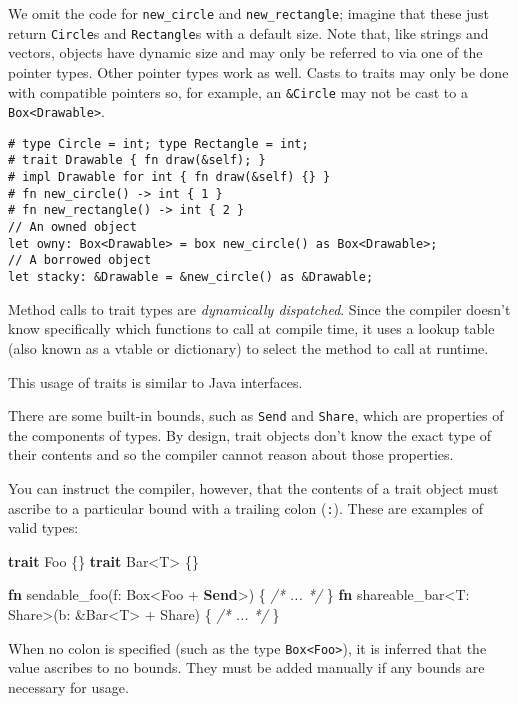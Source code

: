 \documentclass[]{article}
\newenvironment{Shaded}{}{}
\newcommand{\KeywordTok}[1]{\textcolor[rgb]{0.00,0.44,0.13}{\textbf{{#1}}}}
\newcommand{\CommentTok}[1]{\textcolor[rgb]{0.38,0.63,0.69}{\textit{{#1}}}}
\newcommand{\NormalTok}[1]{{#1}}
\begin{document}
We omit the code for \texttt{new\_circle} and \texttt{new\_rectangle};
imagine that these just return \texttt{Circle}s and \texttt{Rectangle}s
with a default size. Note that, like strings and vectors, objects have
dynamic size and may only be referred to via one of the pointer types.
Other pointer types work as well. Casts to traits may only be done with
compatible pointers so, for example, an \texttt{\&Circle} may not be
cast to a \texttt{Box\textless{}Drawable\textgreater{}}.

\begin{verbatim}
# type Circle = int; type Rectangle = int;
# trait Drawable { fn draw(&self); }
# impl Drawable for int { fn draw(&self) {} }
# fn new_circle() -> int { 1 }
# fn new_rectangle() -> int { 2 }
// An owned object
let owny: Box<Drawable> = box new_circle() as Box<Drawable>;
// A borrowed object
let stacky: &Drawable = &new_circle() as &Drawable;
\end{verbatim}

Method calls to trait types are \emph{dynamically dispatched}. Since the
compiler doesn't know specifically which functions to call at compile
time, it uses a lookup table (also known as a vtable or dictionary) to
select the method to call at runtime.

This usage of traits is similar to Java interfaces.

There are some built-in bounds, such as \texttt{Send} and
\texttt{Share}, which are properties of the components of types. By
design, trait objects don't know the exact type of their contents and so
the compiler cannot reason about those properties.

You can instruct the compiler, however, that the contents of a trait
object must ascribe to a particular bound with a trailing colon
(\texttt{:}). These are examples of valid types:

\begin{Shaded}
\begin{Highlighting}[]
\KeywordTok{trait} \NormalTok{Foo \{\}}
\KeywordTok{trait} \NormalTok{Bar<T> \{\}}

\KeywordTok{fn} \NormalTok{sendable_foo(f: Box<Foo + }\KeywordTok{Send}\NormalTok{>) \{ }\CommentTok{/* ... */} \NormalTok{\}}
\KeywordTok{fn} \NormalTok{shareable_bar<T: Share>(b: &Bar<T> + Share) \{ }\CommentTok{/* ... */} \NormalTok{\}}
\end{Highlighting}
\end{Shaded}

When no colon is specified (such as the type
\texttt{Box\textless{}Foo\textgreater{}}), it is inferred that the value
ascribes to no bounds. They must be added manually if any bounds are
necessary for usage.
\end{document}
